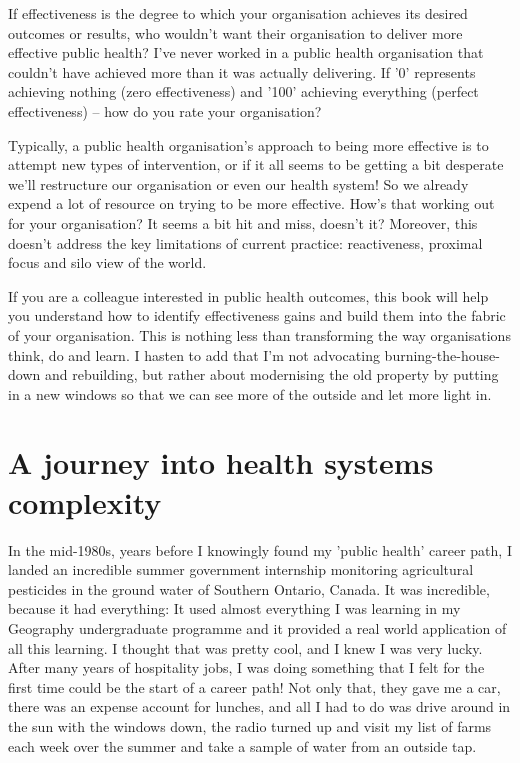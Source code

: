If effectiveness is the degree to which your organisation achieves its desired outcomes or results, who wouldn't want their organisation to deliver more effective public health? I've never worked in a public health organisation that couldn't have achieved more than it was actually delivering. If '0' represents achieving nothing (zero effectiveness) and '100' achieving everything (perfect effectiveness) -- how do you rate your organisation?  

Typically, a public health organisation's approach to being more effective is to attempt new types of intervention, or if it all seems to be getting a bit desperate we'll restructure our organisation or even our health system! So we already expend a lot of resource on trying to be more effective. How's that working out for your organisation? It seems a bit hit and miss, doesn't it? Moreover, this doesn't address the key limitations of current practice: reactiveness, proximal focus and silo view of the world.

If you are a colleague interested in public health outcomes, this book will help you understand how to identify effectiveness gains and build them into the fabric of your organisation. This is nothing less than transforming the way organisations think, do and learn. I hasten to add that I'm not advocating burning-the-house-down and rebuilding, but rather about modernising the old property by putting in a new windows so that we can see more of the outside and let more light in.

\section{A journey into health systems complexity}

In the mid-1980s, years before I knowingly found my 'public health' career path, I landed an incredible summer government internship monitoring agricultural pesticides in the ground water of Southern Ontario, Canada. It was incredible, because it had everything: It used almost everything I was learning in my Geography undergraduate programme and it provided a real world application of all this learning. I thought that was pretty cool, and I knew I was very lucky. After many years of hospitality jobs, I was doing something that I felt for the first time could be the start of a career path! Not only that, they gave me a car, there was an expense account for lunches, and all I had to do was drive around in the sun with the windows down, the radio turned up and visit my list of farms each week over the summer and take a sample of water from an outside tap.

